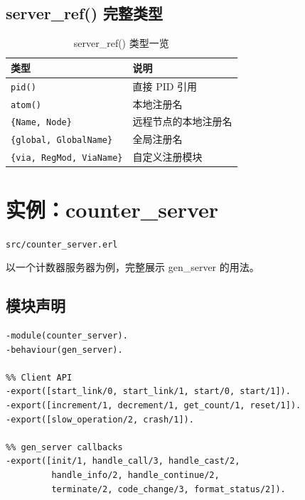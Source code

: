 \documentclass[a4paper,11pt]{article}
\begin{document}
\subsection{server\_ref() 完整类型}

\begin{table}[H]
\centering
\begin{tabular}{@{}ll@{}}
\toprule
\textbf{类型} & \textbf{说明} \\
\midrule
\texttt{pid()} & 直接 PID 引用 \\
\texttt{atom()} & 本地注册名 \\
\texttt{\{Name, Node\}} & 远程节点的本地注册名 \\
\texttt{\{global, GlobalName\}} & 全局注册名 \\
\texttt{\{via, RegMod, ViaName\}} & 自定义注册模块 \\
\bottomrule
\end{tabular}
\caption{server\_ref() 类型一览}
\end{table}




\section{实例：counter\_server}

\begin{notebox}[源码文件]
\texttt{src/counter\_server.erl}
\end{notebox}

以一个计数器服务器为例，完整展示 gen\_server 的用法。

\subsection{模块声明}

\begin{lstlisting}[style=erlangstyle, caption={模块声明与行为模式}]
-module(counter_server).
-behaviour(gen_server).

%% Client API
-export([start_link/0, start_link/1, start/0, start/1]).
-export([increment/1, decrement/1, get_count/1, reset/1]).
-export([slow_operation/2, crash/1]).

%% gen_server callbacks
-export([init/1, handle_call/3, handle_cast/2,
         handle_info/2, handle_continue/2,
         terminate/2, code_change/3, format_status/2]).
\end{lstlisting}
\end{document}
